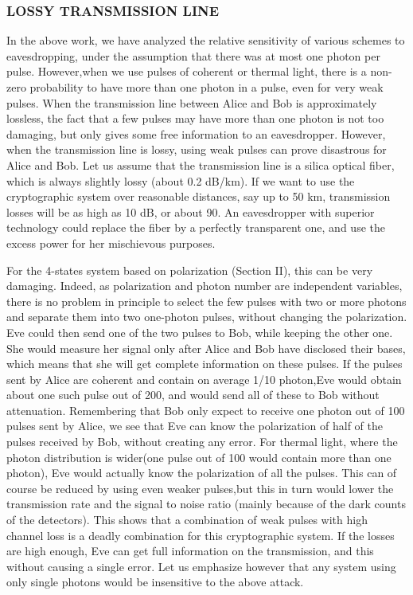 \subsubsection{LOSSY TRANSMISSION LINE}

In the above work, we have analyzed the relative sensitivity of various schemes to eavesdropping, under the assumption that there was at most one photon per pulse. However,when we use pulses of coherent or thermal light, there is a non-zero probability to have more than one photon in a pulse, even for very weak pulses. When the transmission line between Alice and Bob is approximately lossless, the fact that a few pulses may have more than one photon is not too damaging, but only gives some free information to an eavesdropper. However, when the transmission line is lossy, using weak pulses can prove disastrous for Alice and Bob. Let us assume that the transmission line is a silica optical fiber, which is always slightly lossy (about 0.2 dB/km). If we want to use the cryptographic system over reasonable distances, say up to 50 km, transmission losses will be as high as 10 dB, or about 90. An eavesdropper with superior technology could replace the fiber by a perfectly transparent one, and use the excess power for her mischievous purposes.

For the 4-states system based on polarization (Section II), this can be very damaging. Indeed, as polarization and photon number are independent variables, there is no problem in principle to select the few pulses with two or more photons and separate them into two one-photon pulses, without changing the polarization. Eve could then send one of the two pulses to Bob, while keeping the other one. She would measure her signal only after Alice and Bob have disclosed their bases, which means that she will get complete information on these pulses. If the pulses sent by Alice are coherent and contain on average 1/10 photon,Eve would obtain about one such pulse out of 200, and would send all of these to Bob without attenuation. Remembering that Bob only expect to receive one photon out of 100 pulses sent by Alice, we see that Eve can know the polarization of half of the pulses received by Bob, without creating any error. For thermal light, where the photon distribution is wider(one pulse out of 100 would contain more than one photon), Eve would actually know the polarization of all the pulses. This can of course be reduced by using even weaker pulses,but this in turn would lower the transmission rate and the signal to noise ratio (mainly because of the dark counts of the detectors). This shows that a combination of weak pulses with high channel loss is a deadly combination for this cryptographic system. If the losses are high enough, Eve can get full information on the transmission, and this without causing a single error. Let us emphasize however that any system using only single photons would be insensitive to the above attack.

